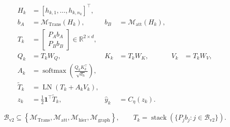 \begin{equation}
\begin{aligned}
H_k &= [h_{k,1},\ldots,h_{k,n_k}]^{\top}, \\
b_A &= \mathcal{M}_{\mathrm{Trans}}(H_k),
& b_B &= \mathcal{M}_{\mathrm{att}}(H_k), \\
T_k &=
\begin{bmatrix}
P_A b_A \\
P_B b_B
\end{bmatrix}
\in\mathbb{R}^{2\times d}, \\
Q_k &= T_kW_Q,
& K_k &= T_kW_K,
& V_k &= T_kW_V, \\
A_k &= \operatorname{softmax}\!\left(\frac{Q_kK_k^{\top}}{\sqrt{d_h}}\right), \\
\widetilde T_k &= \operatorname{LN}\!\left(T_k+A_kV_k\right), \\
z_k &= \frac{1}{2}\mathbf{1}^{\top}\widetilde T_k,
& \widehat y_k &= C_{\eta}(z_k).
\end{aligned}
\label{eq:transnnmil}
\end{equation}

\begin{equation}
\mathcal{B}_{\mathrm{v2}}
\subseteq
\left\{
\mathcal{M}_{\mathrm{Trans}},
\mathcal{M}_{\mathrm{att}},
\mathcal{M}_{\mathrm{hier}},
\mathcal{M}_{\mathrm{graph}}
\right\},
\qquad
T_k=\operatorname{stack}\!\left(\{P_jb_j:j\in\mathcal{B}_{\mathrm{v2}}\}\right).
\label{eq:transnnmil-v2}
\end{equation}
